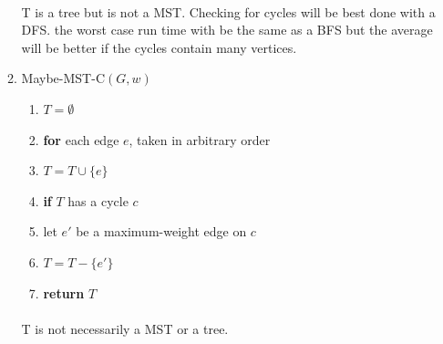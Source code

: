 \documentclass[]{memoir}
\begin{document}
\begin{enumerate}
\begin{enumerate}
\paragraph{}
T is a tree but is not a MST. Checking for cycles will be best done with a DFS. the worst case run time with be the same as a BFS but the average will be better if the cycles contain many vertices. 
\item Maybe-MST-C$(G,w)$
\begin{enumerate}[label=\arabic*\hspace{2mm}]
\item $T=\emptyset$
\item \textbf{for} each edge $e$, taken in arbitrary order
\item \hspace{1cm}$T = T\cup\{e\}$
\item \hspace{1cm}\textbf{if} $T$ has a cycle $c$
\item \hspace{2cm}let $e'$ be a maximum-weight edge on $c$
\item \hspace{2cm}$T=T-\{e'\}$
\item \textbf{return} $T$
\end{enumerate}
\paragraph{}
T is not necessarily a MST or a tree. 
\end{enumerate}
\end{enumerate}
\end{document}
